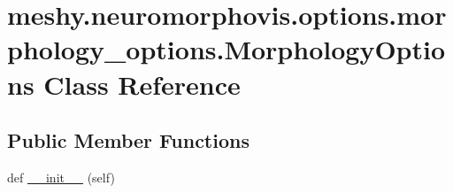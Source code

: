 \hypertarget{classmeshy_1_1neuromorphovis_1_1options_1_1morphology__options_1_1MorphologyOptions}{}\section{meshy.\+neuromorphovis.\+options.\+morphology\+\_\+options.\+Morphology\+Options Class Reference}
\label{classmeshy_1_1neuromorphovis_1_1options_1_1morphology__options_1_1MorphologyOptions}


 


\subsection*{Public Member Functions}
\begin{DoxyCompactItemize}
\item 
def \hyperlink{classmeshy_1_1neuromorphovis_1_1options_1_1morphology__options_1_1MorphologyOptions_a09cd0399abb1c4fb67b4b0a5238d3dfe}{\+\_\+\+\_\+init\+\_\+\+\_\+} (self)
\end{DoxyCompactItemize}
